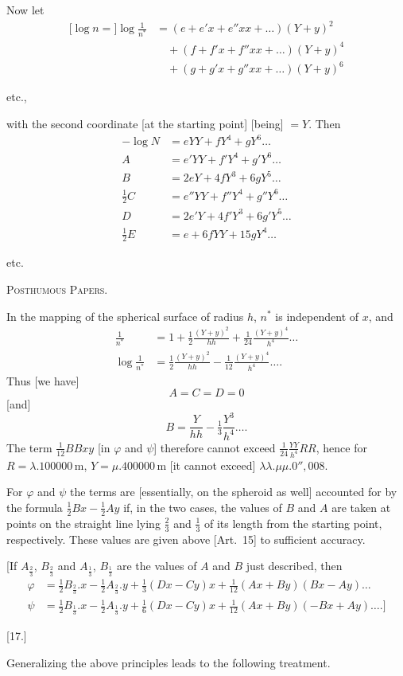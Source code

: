 Now let
\[
\begin{aligned}
\mathopen{[}\log n=]\log\frac1{n^*}&=(e+e'x+e''xx+\ldots)(Y+y)^2\\
&\quad+(f+f'x+f''xx+\ldots)(Y+y)^4\\
&\quad+(g+g'x+g''xx+\ldots)(Y+y)^6
\end{aligned}
\]
\begin{center}etc.,\end{center}
with the second coordinate [at the starting point] [being] $=Y$. Then
\[
\begin{aligned}
-\log N&=eYY+fY^4+gY^6\ldots\\
A&=e'YY+f'Y^4+g'Y^6\ldots\\
B&=2eY+4fY^3+6gY^5\ldots\\
\tfrac12C&=e''YY+f''Y^4+g''Y^6\ldots\\
D&=2e'Y+4f'Y^3+6g'Y^5\ldots\\
\tfrac12E&=e+6fYY+15gY^4\ldots
\end{aligned}
\]
\begin{center}etc.\end{center}
\par\endgroup
\clearpage
{}\hfill\textsc{Posthumous Papers.}\hfill\mbox{}\par\medskip
In the mapping of the spherical surface of radius $h$, $n^*$ is independent of $x$, and
\[
\begin{aligned}
\frac1{n^*}&=1+\tfrac12\frac{(Y+y)^2}{hh}+\tfrac1{24}\frac{(Y+y)^4}{h^4}\ldots\\
\log\frac1{n^*}&=\tfrac12\frac{(Y+y)^2}{hh}-\tfrac1{12}\frac{(Y+y)^4}{h^4}\ldots.
\end{aligned}
\]
Thus [we have]
\[
A=C=D=0
\]
[and]
\[
B=\frac{Y}{hh}-\tfrac13\frac{Y^3}{h^4}\ldots.
\]
The term $\tfrac1{12}BBxy$ [in $\varphi$ and $\psi$] therefore cannot exceed $\tfrac1{24}\frac{YY}{h^4}RR$, hence for $R=\lambda.100000\,\mathrm m$, $Y=\mu.400000\,\mathrm m$ [it cannot exceed] $\lambda\lambda.\mu\mu.0''{,}008$.

For $\varphi$ and $\psi$ the terms are [essentially, on the spheroid as well] accounted for by the formula $\tfrac12Bx-\tfrac12Ay$ if, in the two cases, the values of $B$ and $A$ are taken at points on the straight line lying $\frac23$ and $\frac13$ of its length from the starting point, respectively. These values are given above [Art.~15] to sufficient accuracy.

[If $A_{\frac23}$, $B_{\frac23}$ and $A_{\frac13}$, $B_{\frac13}$ are the values of $A$ and $B$ just described, then
\[
\begin{aligned}
\varphi&=\tfrac12B_{\frac23}.x-\tfrac12A_{\frac23}.y+\tfrac13(Dx-Cy)x+\tfrac1{12}(Ax+By)(Bx-Ay)\ldots\\
\psi&=\tfrac12B_{\frac13}.x-\tfrac12A_{\frac13}.y+\tfrac16(Dx-Cy)x+\tfrac1{12}(Ax+By)(-Bx+Ay)\ldots.]
\end{aligned}
\]
\begin{center}[17.]\end{center}
Generalizing the above principles leads to the following treatment.

